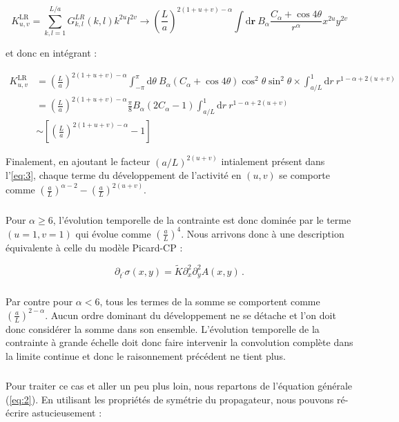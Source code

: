 \begin{equation}
    K^\text{LR}_{u,v} = \sum_{k,l = 1}^{L/a}G_{k,l}^{LR}(k,l)k^{2u}l^{2v}
    \rightarrow \left(\frac{L}{a}\right)^{2(1+u+v)-\alpha}\int \mathrm{d}\mathbf{r}~B_\alpha\frac{C_\alpha+\cos 4\theta}{r^\alpha}x^{2u}y^{2v}
\end{equation}

\noindent et donc en intégrant :

\begin{equation}
\begin{aligned}
    K^\text{LR}_{u,v} &= \left(\frac{L}{a}\right)^{2(1+u+v)-\alpha}\int_{-\pi}^\pi \mathrm{d}\theta~B_\alpha(C_\alpha+\cos 4\theta)\cos^2\theta\sin^2\theta
    \times \int_{a/L}^1 \mathrm{d}r ~ r^{1-\alpha+2(u+v)}\\
    &=\left(\frac{L}{a}\right)^{2(1+u+v)-\alpha}\frac{\pi}{8}B_\alpha(2C_\alpha-1)\int_{a/L}^1 \mathrm{d}r ~ r^{1-\alpha+2(u+v)}\\
    &\sim \left[ \left(\frac{L}{a}\right)^{2(1+u+v)-\alpha}-1 \right]
    \label{eq:eval:I}
\end{aligned}
\end{equation}

\noindent Finalement, en ajoutant le facteur $(a/L)^{2(u+v)}$ intialement présent dans l'\autoref{eq:3}, chaque terme du développement de l'activité en $(u,v)$ se comporte comme $\left(\frac{a}{L}\right)^{\alpha-2}-\left( \frac{a}{L} \right)^{2(u+v)}$.

\subparagraph{}Pour $\alpha \geq 6$, l'évolution temporelle de la contrainte est donc dominée par le terme $(u=1,v=1)$ qui évolue comme $\left( \frac{a}{L} \right)^4$. Nous arrivons donc à une description équivalente à celle du modèle Picard-CP :

\begin{equation}
    \partial_{t^\prime}\sigma (x,y) = \tilde{K}\partial_x^{2}\partial_y^{2}A(x, y)\, .
    \label{eq:evol:sigma:Classa6}
\end{equation}

\subparagraph{}Par contre pour $\alpha < 6$, tous les termes de la somme se comportent comme $\left( \frac{a}{L} \right)^{2-\alpha}$. Aucun ordre dominant du développement ne se détache et l'on doit donc considérer la somme dans son ensemble. L'évolution temporelle de la contrainte à grande échelle doit donc faire intervenir la convolution complète dans la limite continue et donc le raisonnement précédent ne tient plus.

\subparagraph{}Pour traiter ce cas et aller un peu plus loin, nous repartons de l'équation générale (\autoref{eq:2}). En utilisant les propriétés de symétrie du propagateur, nous pouvons ré-écrire astucieusement :

